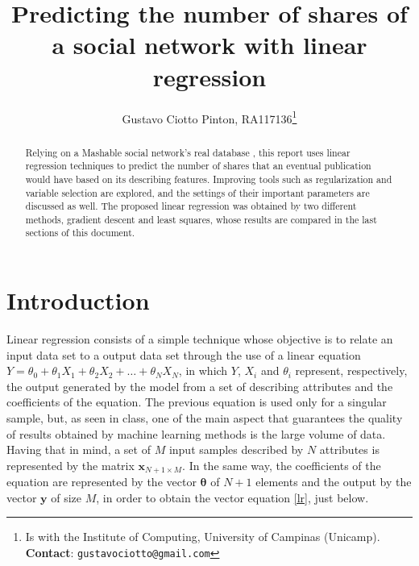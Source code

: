 \documentclass[10pt,twocolumn,letterpaper]{article}
\begin{document}
\title {Predicting the number of shares of a social network with linear regression }
\author{Gustavo Ciotto Pinton, RA117136\thanks{Is with the Institute of Computing, University of Campinas (Unicamp). \textbf{Contact}: \tt\small{gustavociotto@gmail.com}}}

\maketitle
\begin{abstract}
Relying on a Mashable social network's real database \cite{database}, this report uses linear regression techniques to predict the number of shares that an eventual publication would have based on its describing features. Improving tools such as regularization and variable selection are explored, and the settings of their important parameters are discussed as well. The proposed linear regression was obtained by two different methods, gradient descent and least squares, whose results are compared in the last sections of this document.
\end{abstract}

\section{Introduction}
\label{intro}

Linear regression consists of a simple technique whose objective is to relate an input data set to a output data set through the use of a linear equation \(Y = \theta_0 + \theta_1X_1 + \theta_2X_2 + \ldots + \theta_NX_N\), in which \(Y\), \(X_i\) and \(\theta_i\) represent, respectively, the output generated by the model from a set of describing attributes and the coefficients of the equation. The previous equation is used only for a singular sample, but, as seen in class, one of the main aspect that guarantees the quality of results obtained by machine learning methods is the large volume of data. Having that in mind, a set of \(M\)  input samples described by \(N\) attributes is represented by the matrix \(\bm{x}_{N+1\times M}\).  In the same way, the coefficients of the equation are represented by the vector \(\bm{\theta}\) of \(N+1\) elements and the output by the vector \(\bm{y}\) of size \(M\), in order to obtain the vector equation \ref{lr}, just below.
\end{document}
